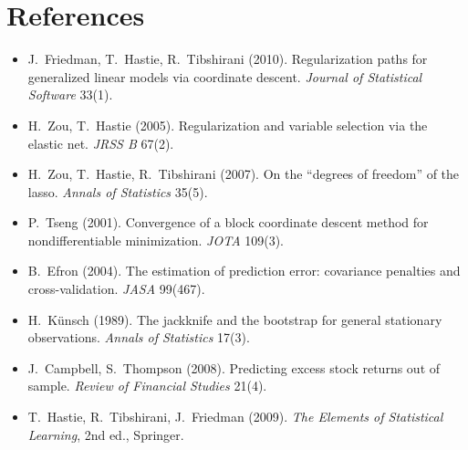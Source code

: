 \documentclass[11pt,a4paper]{article}
\begin{document}
\section*{References}
\begin{itemize}\small
  \item J.~Friedman, T.~Hastie, R.~Tibshirani (2010). Regularization paths for generalized linear
        models via coordinate descent. \emph{Journal of Statistical Software} 33(1).
  \item H.~Zou, T.~Hastie (2005). Regularization and variable selection via the elastic net.
        \emph{JRSS B} 67(2).
  \item H.~Zou, T.~Hastie, R.~Tibshirani (2007). On the ``degrees of freedom'' of the lasso.
        \emph{Annals of Statistics} 35(5).
  \item P.~Tseng (2001). Convergence of a block coordinate descent method for nondifferentiable
        minimization. \emph{JOTA} 109(3).
  \item B.~Efron (2004). The estimation of prediction error: covariance penalties and
        cross-validation. \emph{JASA} 99(467).
  \item H.~K\"unsch (1989). The jackknife and the bootstrap for general stationary observations.
        \emph{Annals of Statistics} 17(3).
  \item J.~Campbell, S.~Thompson (2008). Predicting excess stock returns out of sample.
        \emph{Review of Financial Studies} 21(4).
  \item T.~Hastie, R.~Tibshirani, J.~Friedman (2009). \emph{The Elements of Statistical Learning},
        2nd ed., Springer.
\end{itemize}
\end{document}
